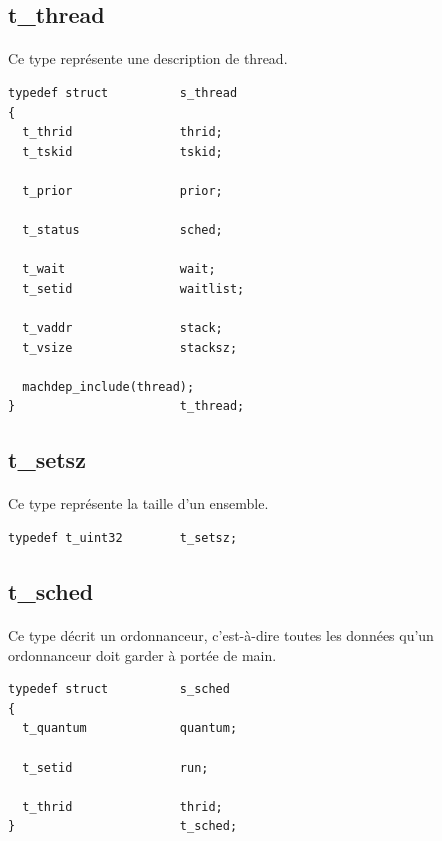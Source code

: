 \documentclass[10pt,a4wide]{article}
\begin{document}
\subsection{t\_thread}

\paragraph{}

Ce type repr\'esente une description de thread.

\begin{verbatim}
typedef struct          s_thread
{
  t_thrid               thrid;
  t_tskid               tskid;

  t_prior               prior;

  t_status              sched;

  t_wait                wait;
  t_setid               waitlist;

  t_vaddr               stack;
  t_vsize               stacksz;

  machdep_include(thread);
}                       t_thread;
\end{verbatim}

\subsection{t\_setsz}

\paragraph{}

Ce type repr\'esente la taille d'un ensemble.

\begin{verbatim}
typedef t_uint32        t_setsz;
\end{verbatim}

\subsection{t\_sched}

\paragraph{}

Ce type d\'ecrit un ordonnanceur, c'est-\`a-dire toutes les donn\'ees
qu'un ordonnanceur doit garder \`a port\'ee de main.

\begin{verbatim}
typedef struct          s_sched
{
  t_quantum             quantum;

  t_setid               run;

  t_thrid               thrid;
}                       t_sched;
\end{verbatim}
\end{document}
